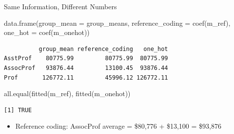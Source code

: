 \documentclass[
  ignorenonframetext,
  aspectratio=169,
]{beamer}
\newenvironment{Shaded}{\begin{snugshade}}{\end{snugshade}}
\newcommand{\AttributeTok}[1]{\textcolor[rgb]{0.40,0.45,0.13}{#1}}
\newcommand{\FunctionTok}[1]{\textcolor[rgb]{0.28,0.35,0.67}{#1}}
\newcommand{\NormalTok}[1]{\textcolor[rgb]{0.00,0.23,0.31}{#1}}
\providecommand{\tightlist}{%
  \setlength{\itemsep}{0pt}\setlength{\parskip}{0pt}}\usepackage{longtable,booktabs,array}
\begin{document}
\begin{frame}[fragile]{Same Information, Different Numbers}
\protect\hypertarget{same-information-different-numbers}{}
\begin{Shaded}
\begin{Highlighting}[]
\FunctionTok{data.frame}\NormalTok{(}\AttributeTok{group\_mean       =}\NormalTok{ group\_means,}
           \AttributeTok{reference\_coding =} \FunctionTok{coef}\NormalTok{(m\_ref),}
           \AttributeTok{one\_hot          =} \FunctionTok{coef}\NormalTok{(m\_onehot))}
\end{Highlighting}
\end{Shaded}

\begingroup\tiny\color{darkgray}

\begin{verbatim}
          group_mean reference_coding   one_hot
AsstProf    80775.99         80775.99  80775.99
AssocProf   93876.44         13100.45  93876.44
Prof       126772.11         45996.12 126772.11
\end{verbatim}

\endgroup

\begin{Shaded}
\begin{Highlighting}[]
\FunctionTok{all.equal}\NormalTok{(}\FunctionTok{fitted}\NormalTok{(m\_ref), }\FunctionTok{fitted}\NormalTok{(m\_onehot))}
\end{Highlighting}
\end{Shaded}

\begingroup\tiny\color{darkgray}

\begin{verbatim}
[1] TRUE
\end{verbatim}

\endgroup

\begin{itemize}
\tightlist
\item
  Reference coding: AssocProf average = \$80,776 + \$13,100 = \$93,876
\end{itemize}
\end{frame}
\end{document}
